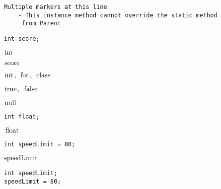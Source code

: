 \documentclass{book}
\def\lthtmlcheckvsize{\ifdim\ht\sizebox<\vsize 
  \ifdim\wd\sizebox<\hsize\expandafter\hfill\fi \expandafter\vfill
  \else\expandafter\vss\fi}%
\begin{document}
{\newpage\clearpage
{}%
\begin{lstlisting}
Multiple markers at this line
	- This instance method cannot override the static method 
	 from Parent
\end{lstlisting}%
\lthtmlfigureZ
\lthtmlcheckvsize\clearpage}

{\newpage\clearpage
{}%
\begin{lstlisting}
int score;
\end{lstlisting}%
\lthtmlfigureZ
\lthtmlcheckvsize\clearpage}

{\newpage\clearpage
{}%
$\lstinline{int}$%
\lthtmlindisplaymathZ
\lthtmlcheckvsize\clearpage}

{\newpage\clearpage
{}%
$\lstinline{score}$%
\lthtmlindisplaymathZ
\lthtmlcheckvsize\clearpage}

{\newpage\clearpage
{}%
$\lstinline{int, for, class}$%
\lthtmlindisplaymathZ
\lthtmlcheckvsize\clearpage}

{\newpage\clearpage
{}%
$\lstinline{true, false}$%
\lthtmlindisplaymathZ
\lthtmlcheckvsize\clearpage}

{\newpage\clearpage
{}%
$\lstinline{null}$%
\lthtmlindisplaymathZ
\lthtmlcheckvsize\clearpage}

{\newpage\clearpage
{}%
\begin{lstlisting}
int float;
\end{lstlisting}%
\lthtmlfigureZ
\lthtmlcheckvsize\clearpage}

{\newpage\clearpage
{}%
$\lstinline{float}$%
\lthtmlindisplaymathZ
\lthtmlcheckvsize\clearpage}

{\newpage\clearpage
{}%
\begin{lstlisting}
int speedLimit = 80;
\end{lstlisting}%
\lthtmlfigureZ
\lthtmlcheckvsize\clearpage}

{\newpage\clearpage
{}%
$\lstinline{speedLimit}$%
\lthtmlindisplaymathZ
\lthtmlcheckvsize\clearpage}

{\newpage\clearpage
{}%
\begin{lstlisting}
int speedLimit;
speedLimit = 80;
\end{lstlisting}%
\lthtmlfigureZ
\lthtmlcheckvsize\clearpage}
\end{document}
